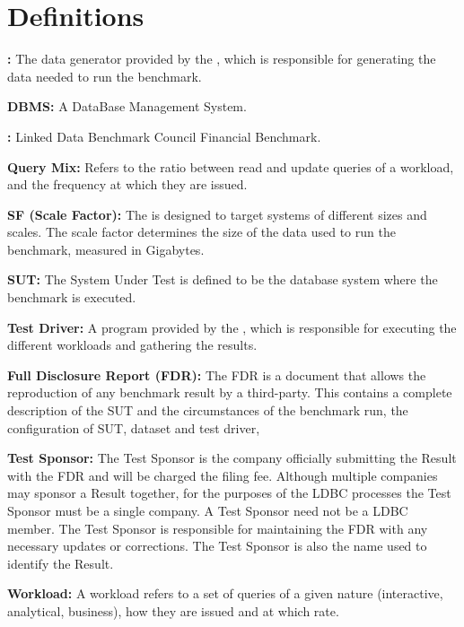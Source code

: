 \chapter*{Definitions}

{\flushleft \textbf{\DataGen:}} The data generator provided by the
\ldbcfinbench, which is responsible for generating the data needed to run the
benchmark.

{\flushleft \textbf{DBMS:}} A DataBase Management System. 

{\flushleft \textbf{\ldbcfinbench:}} Linked Data Benchmark Council Financial
Benchmark. 

{\flushleft \textbf{Query Mix:}} Refers to the ratio between read and update
queries of a workload, and the frequency at which they are issued.

{\flushleft \textbf{SF (Scale Factor):}} The \ldbcfinbench is designed to target
systems of different sizes and scales. The scale factor determines the size of the
data used to run the benchmark, measured in Gigabytes.


{\flushleft \textbf{SUT:}} The System Under Test  is defined to be the database
system where the benchmark is executed.


{\flushleft \textbf{Test Driver:}}  A program provided by the \ldbcfinbench,
which is responsible for executing the different workloads and gathering the
results.

{\flushleft \textbf{Full Disclosure Report (FDR):}} The FDR is a document that
allows the reproduction of any benchmark result by a third-party. This contains
a complete description of the SUT and the circumstances of the benchmark run, \eg
the configuration of SUT, dataset and test driver, \etc

{\flushleft \textbf{Test Sponsor:}} The Test Sponsor is the company officially
submitting the Result with the FDR and will be charged the filing fee. Although
multiple companies may sponsor a Result together, for the purposes of the LDBC
processes the Test Sponsor must be a single company. A Test Sponsor need not be
a LDBC member. The Test Sponsor is responsible for maintaining the FDR with any
necessary updates or corrections. The Test Sponsor is also the name used to
identify the Result.

%



{\flushleft \textbf{Workload:}} A workload refers to a set of queries of a given nature
(\ie interactive, analytical, business), how they are issued and at which rate.
